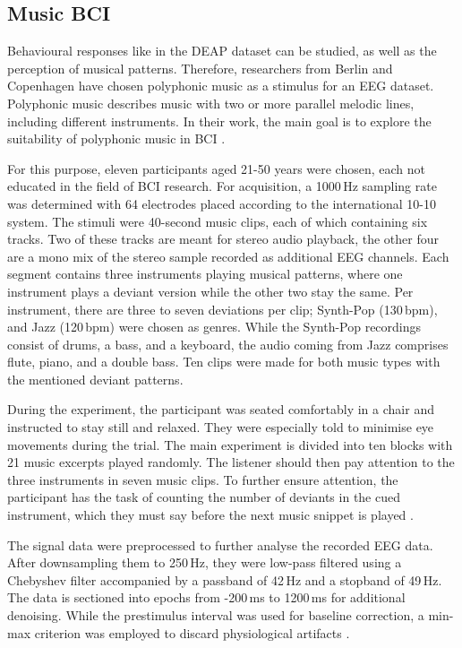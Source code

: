     \subsection{Music BCI}
      Behavioural responses like in the \ac{DEAP} dataset can be studied, as well as the perception of musical patterns. Therefore, researchers from Berlin and Copenhagen have chosen polyphonic music as a stimulus for an \ac{EEG} dataset. Polyphonic music describes music with two or more parallel melodic lines, including different instruments. In their work, the main goal is to explore the suitability of polyphonic music in \ac{BCI} \cite{treder2014decoding}. \par
      For this purpose, eleven participants aged 21-50 years were chosen, each not educated in the field of \ac{BCI} research. For acquisition, a 1000\,Hz sampling rate was determined with 64 electrodes placed according to the international 10-10 system. The stimuli were 40-second music clips, each of which containing six tracks. Two of these tracks are meant for stereo audio playback, the other four are a mono mix of the stereo sample recorded as additional \ac{EEG} channels. Each segment contains three instruments playing musical patterns, where one instrument plays a deviant version while the other two stay the same. Per instrument, there are three to seven deviations per clip; Synth-Pop (130\,bpm), and Jazz (120\,bpm) were chosen as genres. While the Synth-Pop recordings consist of drums, a bass, and a keyboard, the audio coming from Jazz comprises flute, piano, and a double bass. Ten clips were made for both music types with the mentioned deviant patterns. \cite{treder2014decoding}\par
      During the experiment, the participant was seated comfortably in a chair and instructed to stay still and relaxed. They were especially told to minimise eye movements during the trial. The main experiment is divided into ten blocks with 21 music excerpts played randomly. The listener should then pay attention to the three instruments in seven music clips. To further ensure attention, the participant has the task of counting the number of deviants in the cued instrument, which they must say before the next music snippet is played \cite{treder2014decoding}. \par
      The signal data were preprocessed to further analyse the recorded \ac{EEG} data. After downsampling them to 250\,Hz, they were low-pass filtered using a Chebyshev filter accompanied by a passband of 42\,Hz and a stopband of 49\,Hz. The data is sectioned into epochs from -200\,ms to 1200\,ms for additional denoising. While the prestimulus interval was used for baseline correction, a min-max criterion was employed to discard physiological artifacts \cite{treder2014decoding}. \par
        
